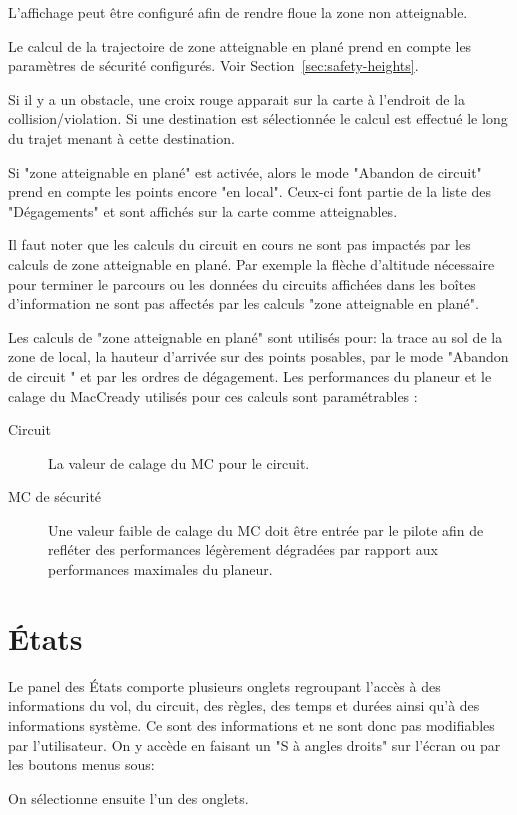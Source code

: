 L'affichage peut être configuré afin de rendre floue la zone non atteignable. 

Le calcul de la trajectoire de zone atteignable en plané prend en compte les paramètres de sécurité configurés.  Voir Section~\ref{sec:safety-heights}.

Si il y a un obstacle, une croix rouge apparait sur la carte à l'endroit de la collision/violation. Si une destination est sélectionnée le calcul est effectué le long du trajet menant à cette destination.

Si "zone atteignable en plané" est activée, alors le mode "Abandon de circuit" prend en compte les points encore "en local". Ceux-ci font partie de la liste des "Dégagements" et sont affichés sur la carte comme atteignables.

Il faut noter que les calculs du circuit en cours ne sont pas impactés par les calculs de zone atteignable en plané. Par exemple la flèche d'altitude nécessaire pour terminer le parcours ou les données du circuits affichées dans les boîtes d'information ne sont pas affectés par les calculs "zone atteignable en plané".

Les calculs de "zone atteignable en plané" sont utilisés pour: la trace au sol de la zone de local, la hauteur d'arrivée sur des points posables, par le mode "Abandon de circuit " et par les ordres de dégagement. Les performances du planeur et le calage du MacCready utilisés pour ces calculs sont paramétrables :
\begin{description}
\item[Circuit] La valeur de calage du MC pour le circuit.
\item[MC de sécurité] Une valeur faible de calage du MC doit être entrée par le pilote afin de refléter des performances légèrement dégradées par rapport aux performances maximales du planeur.

\end{description}


\section{États}\label{sec:flight-status}

Le panel des États comporte plusieurs onglets regroupant l'accès à des informations du vol, du circuit, des règles, des temps et durées ainsi qu'à des informations système. Ce sont des informations et ne sont donc pas modifiables par l'utilisateur.
On y accède en faisant un "S à angles droits" sur l'écran ou par les boutons menus sous:
\begin{quote}
\blink{}
\end{quote}
On sélectionne ensuite l'un des onglets.


